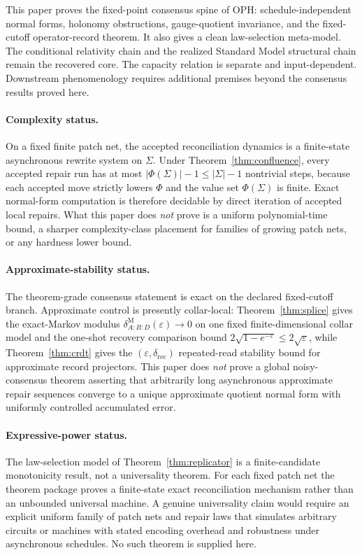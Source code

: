 \documentclass[11pt]{article}
\theoremstyle{remark}
\theoremstyle{plain}
\begin{document}
This paper proves the fixed-point consensus spine of OPH: schedule-independent normal forms,
holonomy obstructions, gauge-quotient invariance, and the fixed-cutoff operator-record theorem.
It also gives a
clean law-selection meta-model. The conditional relativity chain and the realized Standard Model
structural chain remain the recovered core. The capacity relation is separate and input-dependent.
Downstream phenomenology requires additional premises beyond the consensus results proved here.

\paragraph{Complexity status.}
On a fixed finite patch net, the accepted reconciliation dynamics is a finite-state asynchronous
rewrite system on \(\Sigma\). Under Theorem~\ref{thm:confluence}, every accepted repair run has at
most \(|\Phi(\Sigma)|-1\le |\Sigma|-1\) nontrivial steps, because each accepted move strictly
lowers \(\Phi\) and the value set \(\Phi(\Sigma)\) is finite. Exact normal-form computation is
therefore decidable by direct iteration of accepted local repairs. What this paper does
\emph{not} prove is a uniform polynomial-time bound, a sharper complexity-class placement for
families of growing patch nets, or any hardness lower bound.

\paragraph{Approximate-stability status.}
The theorem-grade consensus statement is exact on the declared fixed-cutoff branch. Approximate
control is presently collar-local: Theorem~\ref{thm:splice} gives the exact-Markov modulus
\(\delta^{\mathrm M}_{A:B:D}(\varepsilon)\to0\) on one fixed finite-dimensional collar model and
the one-shot recovery comparison bound \(2\sqrt{1-e^{-\varepsilon}}\le 2\sqrt{\varepsilon}\),
while Theorem~\ref{thm:crdt} gives the \((\varepsilon,\delta_{\mathrm{rec}})\) repeated-read
stability bound for approximate record projectors. This paper does \emph{not} prove a
global noisy-consensus theorem asserting that arbitrarily long asynchronous approximate repair
sequences converge to a unique approximate quotient normal form with uniformly controlled
accumulated error.

\paragraph{Expressive-power status.}
The law-selection model of Theorem~\ref{thm:replicator} is a finite-candidate monotonicity result,
not a universality theorem. For each fixed patch net the theorem package proves a
finite-state exact reconciliation mechanism rather than an unbounded universal machine. A genuine
universality claim would require an explicit uniform family of patch nets and repair laws that
simulates arbitrary circuits or machines with stated encoding overhead and robustness under
asynchronous schedules. No such theorem is supplied here.
\end{document}
